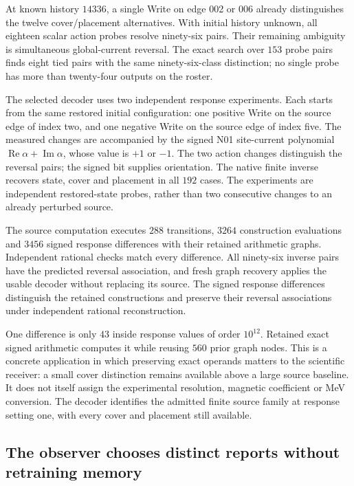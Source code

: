 At known history $14336$, a single Write on edge 002 or 006 already distinguishes the twelve cover/placement alternatives. With initial history unknown, all eighteen scalar action probes resolve ninety-six pairs. Their remaining ambiguity is simultaneous global-current reversal. The exact search over $153$ probe pairs finds eight tied pairs with the same ninety-six-class distinction; no single probe has more than twenty-four outputs on the roster.

The selected decoder uses two independent response experiments. Each starts from the same restored initial configuration: one positive Write on the source edge of index two, and one negative Write on the source edge of index five. The measured changes are accompanied by the signed N01 site-current polynomial $\operatorname{Re}\alpha+\operatorname{Im}\alpha$, whose value is $+1$ or $-1$. The two action changes distinguish the reversal pairs; the signed bit supplies orientation. The native finite inverse recovers state, cover and placement in all $192$ cases. The experiments are independent restored-state probes, rather than two consecutive changes to an already perturbed source.

The source computation executes $288$ transitions, $3264$ construction evaluations and $3456$ signed response differences with their retained arithmetic graphs. Independent rational checks match every difference. All ninety-six inverse pairs have the predicted reversal association, and fresh graph recovery applies the usable decoder without replacing its source. The signed response differences distinguish the retained constructions and preserve their reversal associations under independent rational reconstruction.

One difference is only $43$ inside response values of order $10^{12}$. Retained exact signed arithmetic computes it while reusing $560$ prior graph nodes. This is a concrete application in which preserving exact operands matters to the scientific receiver: a small cover distinction remains available above a large source baseline. It does not itself assign the experimental resolution, magnetic coefficient or MeV conversion. The decoder identifies the admitted finite source family at response setting one, with every cover and placement still available.

\subsection{The observer chooses distinct reports without retraining memory}

